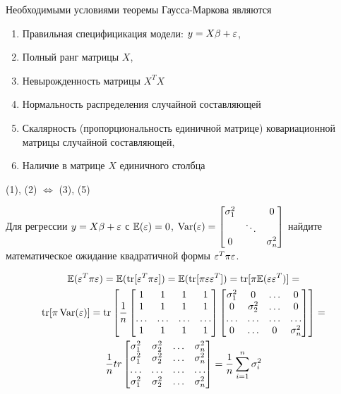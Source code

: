 \begin{problem}
Необходимыми условиями теоремы Гаусса-Маркова являются
\begin{enumerate}
\item Правильная специфицикация модели: $y = X\beta + \varepsilon$,
\item Полный ранг матрицы $X$,
\item Невырожденность матрицы $X^T X$
\item Нормальность распределения случайной составляющей
\item Скалярность (пропорциональность единичной матрице) ковариационной матрицы случайной составляющей,
\item Наличие в матрице $X$ единичного столбца
\end{enumerate}
\end{problem}

\begin{solution}
(1), (2) $\Leftrightarrow$ (3), (5)
\end{solution}


\begin{problem}
Для регрессии $y = X\beta + \varepsilon$ с $\mathbb{E}(\varepsilon) = 0$, $\operatorname{Var}(\varepsilon) = \begin{bmatrix}
\sigma_1^2 &  & 0 \\
  & \ddots &   \\
0 &  & \sigma^2_n
\end{bmatrix}$ найдите математическое ожидание квадратичной формы $\varepsilon^T \pi \varepsilon$.
\end{problem}


\begin{solution}
\begin{multline}
\mathbb{E}(\varepsilon^T \pi \varepsilon) = \mathbb{E}(\operatorname{tr}[\varepsilon^T \pi \varepsilon]) = \mathbb{E}(\operatorname{tr}[\pi \varepsilon \varepsilon^T]) = \operatorname{tr}[\pi \mathbb{E}(\varepsilon\varepsilon^T)]  =\\
\operatorname{tr}[\pi \operatorname{Var}(\varepsilon)] = \operatorname{tr}\left[ \frac{1}{n} \begin{bmatrix}
1 & 1 & 1 & 1 \\
1 & 1 & 1 & 1 \\
\ldots & \ldots & \ldots & \ldots \\
1 & 1 & 1 & 1 \\
\end{bmatrix} \begin{bmatrix}
\sigma_1^2 & 0 & \ldots & 0 \\
0 & \sigma_2^2 & \ldots & 0 \\
\ldots & \ldots & \ldots & \ldots \\
0 & \ldots & 0 & \sigma_n^2 \\
\end{bmatrix} \right] = \\
\frac{1}{n} tr\begin{bmatrix}
\sigma_1^2 & \sigma_2^2 & \ldots & \sigma_n^2 \\
\sigma_1^2 & \sigma_2^2 & \ldots & \sigma_n^2 \\
\ldots & \ldots & \ldots & \ldots \\
\sigma_1^2 & \sigma_2^2 & \ldots & \sigma_n^2 \\
\end{bmatrix} = \frac{1}{n} \sum_{i=1}^n \sigma_i^2
\end{multline}
\end{solution}

